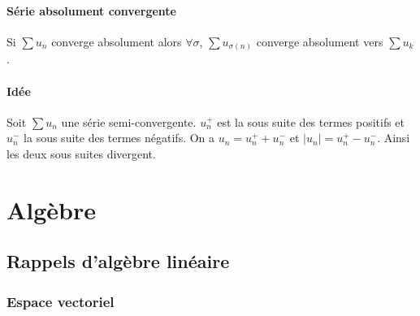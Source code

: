 \documentclass[a4paper,10pt]{book} %
\newcommand{\abs}[1]{\left|#1\right|}
\begin{document}
\subsection{Série absolument convergente}
Si $\sum u_n$ converge absolument alors $\forall\sigma$, $\sum u_{\sigma(n)}$ converge absolument vers $\sum u_k$.

\subsection{Idée}
Soit $\sum u_n$ une série semi-convergente. $u_n^+$ est la sous suite des termes positifs et $u_n^-$ la sous suite des termes négatifs.
On a $u_n=u_n^++u_n^-$ et $\abs{u_n}=u_n^+-u_n^-$.
Ainsi les deux sous suites divergent.


\part{Algèbre}

\chapter{Rappels d'algèbre linéaire}
\section{Espace vectoriel}
\end{document}
